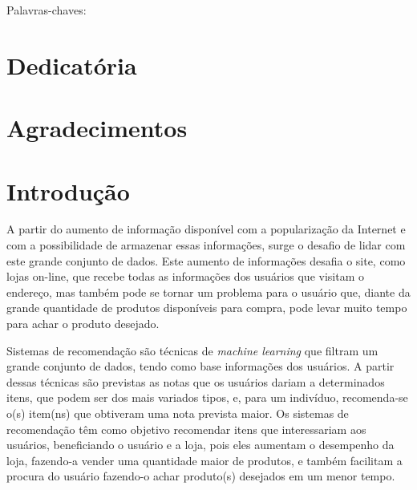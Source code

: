 \documentclass[12pt,a4paper,header]{abnt}
\begin{document}
\begin{resumo}

\vspace{1cm}
\noindent Palavras-chaves: 


\end{resumo}



\chapter*{Dedicatória}



\chapter*{Agradecimentos}



\tableofcontents{}
\listoffigures
\listoftables



\chapter{Introdução} \label{cap:introducao}

A partir do aumento de informação disponível com a popularização da Internet e com a possibilidade de armazenar essas informações, surge o desafio de lidar com este grande conjunto de dados\cite{isinkaye2015recommendation}. Este aumento de informações desafia o site, como lojas on-line, que recebe todas as informações dos usuários que visitam o endereço, mas também pode se tornar um problema para o usuário que, diante da grande quantidade de produtos disponíveis para compra, pode levar muito tempo para achar o produto desejado\cite{mild2002collaborative}.

Sistemas de recomendação são técnicas de \textit{machine learning} que filtram um grande conjunto de dados, tendo como base informações dos usuários\cite{takahashi2015estudo}. A partir dessas técnicas são previstas as notas que os usuários dariam a determinados itens, que podem ser dos mais variados tipos, e, para um indivíduo, recomenda-se o(s) item(ns) que obtiveram uma nota prevista maior\cite{shapira2011recommender}. Os sistemas de recomendação têm como objetivo recomendar itens que interessariam aos usuários\cite{melville2011recommender}, beneficiando o usuário e a loja, pois eles aumentam o desempenho da loja, fazendo-a vender uma quantidade maior de produtos, e também facilitam a procura do usuário fazendo-o achar produto(s) desejados em um menor tempo\cite{isinkaye2015recommendation}. 
\end{document}
